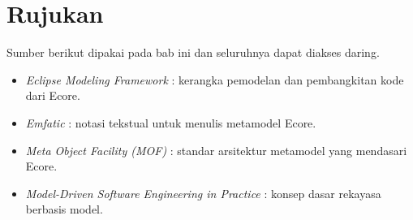 \section{Rujukan}

Sumber berikut dipakai pada bab ini dan seluruhnya dapat diakses daring.

\begin{itemize}
  \item \textit{Eclipse Modeling Framework} \cite{doc-emf}: kerangka pemodelan dan pembangkitan kode dari Ecore.
  \item \textit{Emfatic} \cite{doc-emfatic}: notasi tekstual untuk menulis metamodel Ecore.
  \item \textit{Meta Object Facility (MOF)} \cite{omg-mof}: standar arsitektur metamodel yang mendasari Ecore.
  \item \textit{Model-Driven Software Engineering in Practice} \cite{brambilla2017mdse}: konsep dasar rekayasa berbasis model.
\end{itemize}
